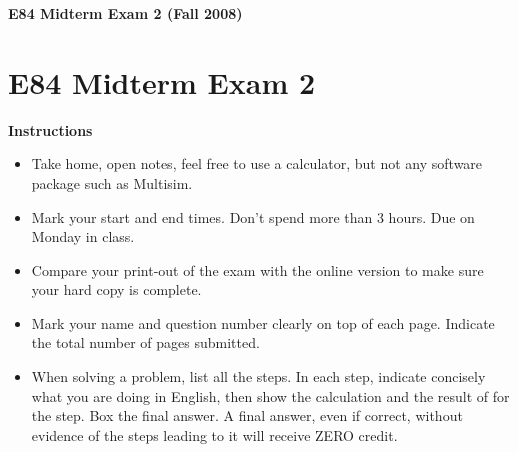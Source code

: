 \documentclass{article}
\begin{document}
\begin{center}
{\Large \bf  E84 Midterm Exam 2 (Fall 2008)}
\end{center}

\section*{E84 Midterm Exam 2}

{\bf Instructions}
\begin{itemize}
\item Take home, open notes, feel free to use a calculator, but not any software 
  package such as Multisim. 
\item Mark your start and end times. Don't spend more than 3 hours. Due on 
  Monday in class.
\item Compare your print-out of the exam with the online version to make
  sure your hard copy is complete.
\item Mark your name and question number clearly on top of each page.
  Indicate the total number of pages submitted.
\item When solving a problem, list all the steps. In each step, indicate
  concisely what you are doing in English, then show the calculation 
  and the result of for the step. Box the final answer.
  A final answer, even if correct, without evidence of the steps leading
  to it will receive ZERO credit.
\end{itemize}
\end{document}
